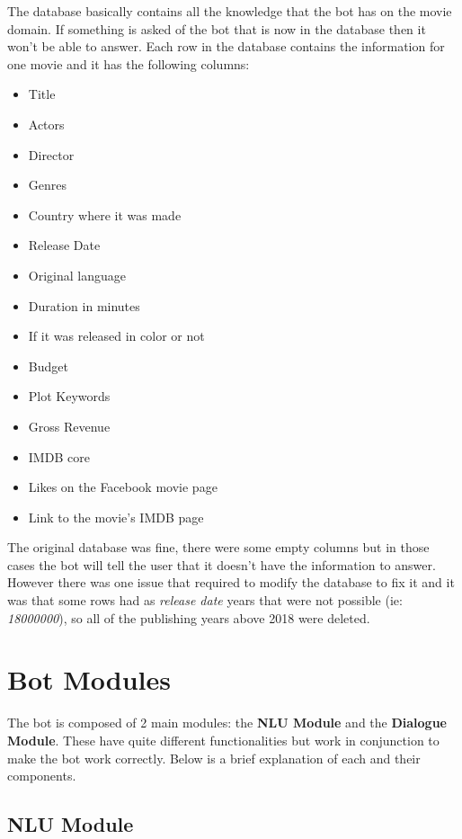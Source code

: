 \documentclass[11pt,a4paper]{article}
\begin{document}
		The database basically contains all the knowledge that the bot has on the movie domain. If something is asked of the bot that is now in the database then it won't be able to answer. Each row in the database contains the information for one movie and it has the following columns:
		
		\begin{itemize}
		\setlength\itemsep{-0.48em}
			\item Title 
			\item Actors
			\item Director
			\item Genres
			\item Country where it was made
			\item Release Date
			\item Original language
			\item Duration in minutes
			\item If it was released in color or not
			\item Budget
			\item Plot Keywords
			\item Gross Revenue
			\item IMDB core
			\item Likes on the Facebook movie page
			\item Link to the movie's IMDB page
		\end{itemize}

		
		The original database was fine, there were some empty columns but in those cases the bot will tell the user that it doesn't have the information to answer. However there was one issue that required to modify the database to fix it and it was that some rows had as \textit{release date} years that were not possible (ie: \textit{18000000}), so all of the publishing years above 2018 were deleted.


\section{Bot Modules}
\label{sec-bot-modules}

	The bot is composed of 2 main modules: the \textbf{NLU Module} and the \textbf{Dialogue Module}. These have quite different functionalities but work in conjunction to make the bot work correctly. Below is a brief explanation of each and their components.

	\subsection{NLU Module}
	\label{ssec-nlu-module}
	
\end{document}

